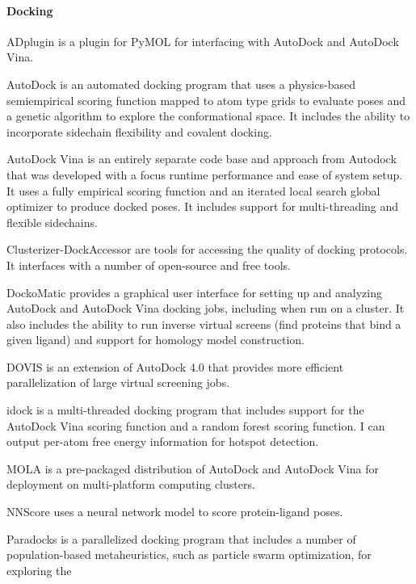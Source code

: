 \paragraph{Docking}

ADplugin is a plugin for PyMOL for interfacing with AutoDock and AutoDock Vina.

AutoDock \cite{Morris_2009} is an automated docking program that uses a physics-based semiempirical scoring function \cite{Huey_2007} mapped to atom type grids to evaluate poses and a genetic algorithm to explore the conformational space.  It includes the ability to incorporate sidechain flexibility and covalent docking.

AutoDock Vina \cite{Trott_2009} is an entirely separate code base and approach from Autodock that was developed with a focus runtime performance and ease of system setup. It uses a fully empirical scoring function and an iterated local search global optimizer to produce docked poses. It includes support for multi-threading and flexible sidechains.

Clusterizer-DockAccessor \cite{Ballante_2016} are tools for accessing the quality of docking protocols. It interfaces with a number of open-source and free tools.

DockoMatic \cite{Bullock_2013}  provides a graphical user interface for setting up and analyzing AutoDock and AutoDock Vina docking jobs, including when run on a cluster. It also includes the ability to run inverse virtual screens (find proteins that bind a given ligand) and support for homology model construction.

DOVIS \cite{Jiang_2008} is an extension of AutoDock 4.0 that provides more efficient parallelization of large virtual screening jobs.

idock \cite{Li_2012} is a multi-threaded docking program that includes support for the AutoDock Vina scoring function and a random forest scoring function. I can output per-atom free energy information for hotspot detection.

MOLA \cite{Abreu_2010} is a pre-packaged distribution of AutoDock and AutoDock Vina for deployment on multi-platform computing clusters.

NNScore \cite{Durrant_2011} uses a neural network model to score protein-ligand poses.

Paradocks \cite{Meier_2010} is a parallelized docking program that includes a number of population-based metaheuristics, such as particle swarm optimization, for exploring the 

